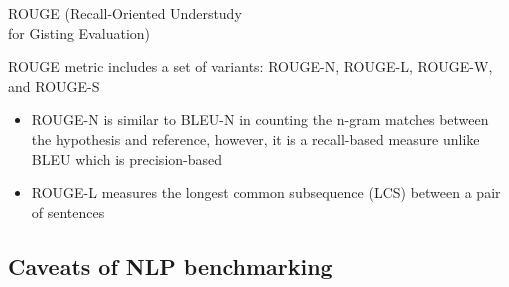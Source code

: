 \documentclass[12pt,aspectratio=169,handout]{beamer}
\begin{document}
\begin{frame}{ROUGE (Recall-Oriented Understudy\\ for Gisting Evaluation)}
	
ROUGE metric includes a set of variants: ROUGE-N, ROUGE-L, ROUGE-W, and ROUGE-S

\begin{itemize}
	\item ROUGE-N is similar to BLEU-N in counting the n-gram matches between the hypothesis and reference, however, it is a recall-based measure unlike BLEU which is precision-based
	\item ROUGE-L measures the longest common subsequence (LCS) between a pair of sentences	
\end{itemize}



\end{frame}


\subsection{Caveats of NLP benchmarking}
\end{document}
